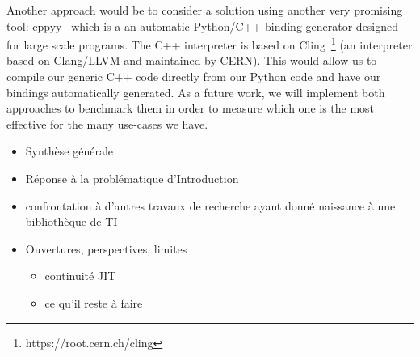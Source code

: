 Another approach would be to consider a solution using another very promising tool:
cppyy~\cite{wimtlplavrijsen.2016.cppyy} which is a an automatic Python/C++ binding generator designed for large scale
programs. The C++ interpreter is based on Cling~\footnote{https://root.cern.ch/cling} (an interpreter based on
Clang/LLVM and maintained by CERN). This would allow us to compile our generic C++ code directly from our Python code
and have our bindings automatically generated. As a future work, we will implement both approaches to benchmark them in
order to measure which one is the most effective for the many use-cases we have.

\clearpage


\begin{itemize}
  \item Synthèse générale
  \item Réponse à la problématique d'Introduction
  \item confrontation à d'autres travaux de recherche ayant donné naissance à une bibliothèque de TI
  \item Ouvertures, perspectives, limites
        \begin{itemize}
          \item continuité JIT
          \item ce qu'il reste à faire
        \end{itemize}
\end{itemize}